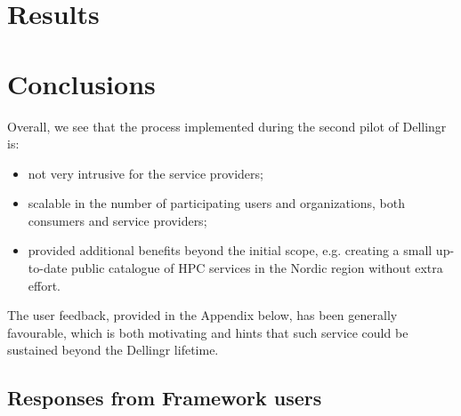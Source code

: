 \documentclass{article}
\begin{document}
\section{Results}
\label{sec:results}


\section{Conclusions}

Overall, we see that the process implemented during the second pilot of Dellingr is:
\begin{itemize}
\item not very intrusive for the service providers;
\item scalable in the number of participating users and organizations, both consumers and service providers;
\item provided additional benefits beyond the initial scope, e.g. creating a small up-to-date public catalogue of HPC services in the Nordic region without extra effort.
\end{itemize} 

The user feedback, provided in the Appendix below, has been generally favourable, which is both motivating and hints that such service could be sustained beyond the Dellingr lifetime.

\newpage
{}


\begin{appendices}

\section{Responses from Framework users}
\label{app:answers}

\end{appendices}
\end{document}
